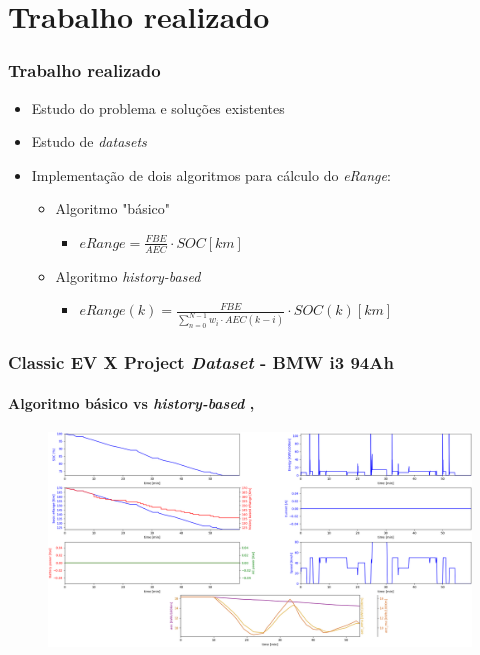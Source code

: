 \documentclass{beamer}
\begin{document}
\section[Trabalho realizado]{Trabalho realizado}
\begin{frame}
\frametitle{Trabalho realizado}

\begin{itemize}
	\item Estudo do problema e soluções existentes
	\item Estudo de \textit{datasets}
	\item Implementação de dois algoritmos para cálculo do \textit{eRange}:
		  \begin{itemize}
		      \item Algoritmo "básico" 
			  \begin{itemize}
				  \item $eRange=\frac{FBE}{AEC} \cdot SOC [km]$
			  \end{itemize}
			  \item Algoritmo \textit{history-based} 
			  \begin{itemize}
				\item $eRange(k)=\frac{FBE}{\sum_{n=0}^{N-1} w_{i} \cdot  AEC(k-i)} \cdot SOC(k) [km]$
			\end{itemize}
		  \end{itemize}
\end{itemize}

\end{frame}

\begin{frame}
	\frametitle{Classic EV X Project \textit{Dataset} - BMW i3 94Ah}
	\framesubtitle{
		Algoritmo básico vs \textit{history-based} 
		, 
	}
	\vspace{-0.5cm}
	\begin{figure}[H]
		\begin{center}
			\includegraphics[scale=0.22]{./figures/demo_application_classic.png}
		\end{center}
	\end{figure}
	
\end{frame}
\end{document}
